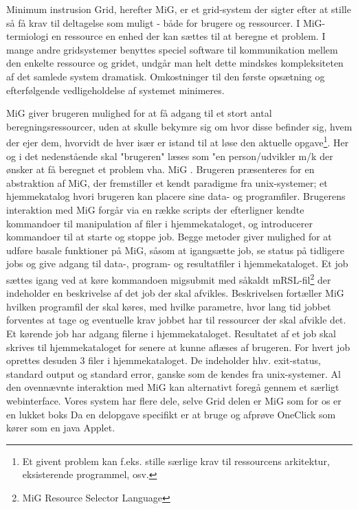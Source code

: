 \documentclass[draft,a4paper,10pt]{article}
\begin{document}
Minimum instrusion Grid, herefter MiG, er et grid-system der sigter efter at stille så få krav til deltagelse som muligt - både for brugere og ressourcer. I MiG-termiologi en ressource en enhed der kan sættes til at beregne et problem. I mange andre gridsystemer benyttes speciel software til kommunikation mellem den enkelte ressource og gridet, undgår man helt dette mindskes kompleksiteten af det samlede system dramatisk. Omkostninger til den første opsætning og efterfølgende vedligeholdelse af systemet minimeres.    

MiG giver brugeren mulighed for at få adgang til et stort antal beregningsressourcer, uden at skulle bekymre sig om hvor disse befinder sig, hvem der ejer dem, hvorvidt de hver især er istand til at løse den aktuelle opgave\footnote{Et givent problem kan f.eks. stille særlige krav til ressourcens arkitektur, eksisterende programmel, osv. }. Her og i det nedenstående skal "brugeren" læses som "en person/udvikler m/k der ønsker at få beregnet et problem vha. MiG . Brugeren præsenteres for en abstraktion af MiG, der fremstiller et kendt paradigme fra unix-systemer; et hjemmekatalog hvori brugeren kan placere sine data- og programfiler. Brugerens interaktion med MiG forgår via en række scripts der efterligner kendte kommandoer til manipulation af filer i hjemmekataloget, og introducerer kommandoer til at starte og stoppe job. Begge metoder giver mulighed for at udføre basale funktioner på MiG, såsom at igangsætte job, se status på tidligere jobs og give adgang til data-, program- og resultatfiler i hjemmekataloget. Et job sættes igang ved at køre kommandoen migsubmit med såkaldt mRSL-fil\footnote{MiG Resource Selector Language} der indeholder en beskrivelse af det job der skal afvikles. Beskrivelsen fortæller MiG hvilken programfil der skal køres, med hvilke parametre, hvor lang tid jobbet forventes at tage og eventuelle krav jobbet har til ressourcer der skal afvikle det. Et kørende job har adgang filerne i  hjemmekataloget. Resultatet af et job skal skrives til hjemmekataloget for senere at kunne aflæses af brugeren. For hvert job oprettes desuden 3 filer i hjemmekataloget. De indeholder hhv. exit-status, standard output og standard error, ganske som de kendes fra unix-systemer. 
Al den ovennævnte interaktion med MiG kan alternativt foregå gennem et særligt webinterface. 
Vores system har flere dele, selve Grid delen er MiG som for os er en lukket boks
Da en delopgave specifikt er at bruge og afprøve OneClick som kører som en java Applet.
\end{document}
